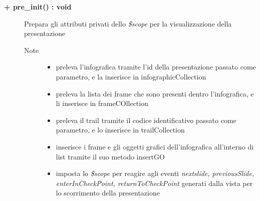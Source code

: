 \begin{description}
\begin{description}
	\end{description}
	
	\begin{description}
		\item[\textbf{\color{blue}+ pre\_init() : void			}] \hfill
			Prepara gli attributi privati dello \textit{\$scope} per la visualizzazione della presentazione
			
		\begin{description}
			\item[Note] \hfill
			\begin{itemize}
					\item preleva l'infografica tramite l'id della presentazione passato come parametro, e la inserisce in infographicCollection
					\item preleva la lista dei frame che sono presenti dentro l'infografica, e li inserisce in frameCOllection
					\item preleva il trail tramite il codice identificativo passato come parametro, e lo inserisce in trailCollection
					\item inserisce i frame e gli oggetti grafici dell'infografica all'interno di list tramite il suo metodo insertGO
					\item imposta lo \textit{\$scope} per reagire agli eventi \textit{nextslide, previousSlide, enterInCheckPoint, returnToCheckPoint} generati dalla vista per lo scorrimento della presentazione
			\end{itemize}
		\end{description}
	\end{description}

\end{description}









